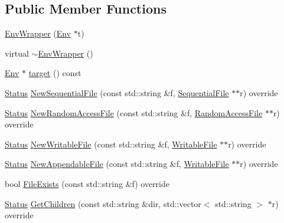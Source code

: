 \subsection*{Public Member Functions}
\begin{DoxyCompactItemize}
\item 
\mbox{\hyperlink{classleveldb_1_1_env_wrapper_a724d3740db2663034c8974c0378e49cb}{Env\+Wrapper}} (\mbox{\hyperlink{classleveldb_1_1_env}{Env}} $\ast$t)
\item 
virtual \mbox{\hyperlink{classleveldb_1_1_env_wrapper_a4f4417d2cd1551edfa9bc1cdaa41a10f}{$\sim$\+Env\+Wrapper}} ()
\item 
\mbox{\hyperlink{classleveldb_1_1_env}{Env}} $\ast$ \mbox{\hyperlink{classleveldb_1_1_env_wrapper_ac9bdbc7110de3bdbc42c04ca65f68de6}{target}} () const
\item 
\mbox{\hyperlink{classleveldb_1_1_status}{Status}} \mbox{\hyperlink{classleveldb_1_1_env_wrapper_a3681800d0263b7bc77a066fdfb69e005}{New\+Sequential\+File}} (const std\+::string \&f, \mbox{\hyperlink{classleveldb_1_1_sequential_file}{Sequential\+File}} $\ast$$\ast$r) override
\item 
\mbox{\hyperlink{classleveldb_1_1_status}{Status}} \mbox{\hyperlink{classleveldb_1_1_env_wrapper_ac1143b03917d33af0a946862f6a452fc}{New\+Random\+Access\+File}} (const std\+::string \&f, \mbox{\hyperlink{classleveldb_1_1_random_access_file}{Random\+Access\+File}} $\ast$$\ast$r) override
\item 
\mbox{\hyperlink{classleveldb_1_1_status}{Status}} \mbox{\hyperlink{classleveldb_1_1_env_wrapper_a3e4991deec0666b177cf0f699efa2ca8}{New\+Writable\+File}} (const std\+::string \&f, \mbox{\hyperlink{classleveldb_1_1_writable_file}{Writable\+File}} $\ast$$\ast$r) override
\item 
\mbox{\hyperlink{classleveldb_1_1_status}{Status}} \mbox{\hyperlink{classleveldb_1_1_env_wrapper_a8fc08d24c02191608af21473504ea15e}{New\+Appendable\+File}} (const std\+::string \&f, \mbox{\hyperlink{classleveldb_1_1_writable_file}{Writable\+File}} $\ast$$\ast$r) override
\item 
bool \mbox{\hyperlink{classleveldb_1_1_env_wrapper_ae046fc226c039a8eb5d00c59eb0f47ba}{File\+Exists}} (const std\+::string \&f) override
\item 
\mbox{\hyperlink{classleveldb_1_1_status}{Status}} \mbox{\hyperlink{classleveldb_1_1_env_wrapper_a5382cf15ad3a80c23f291238125d752d}{Get\+Children}} (const std\+::string \&dir, std\+::vector$<$ std\+::string $>$ $\ast$r) override
\item 

\end{DoxyCompactItemize}
